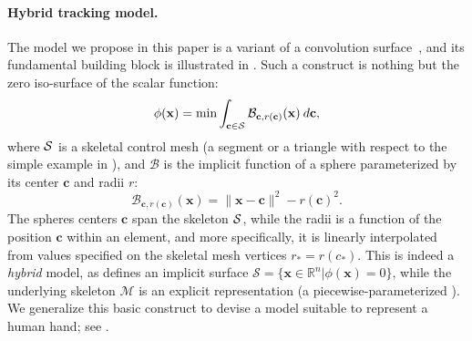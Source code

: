 \paragraph{Hybrid tracking model.}
The model we propose in this paper is a variant of a convolution surface~\cite{bloomenthal1991convolution}, and its fundamental building block is illustrated in . Such a construct is nothing but the zero iso-surface of the scalar function:
\begin{equation}
\phi(\mathbf{x}) = \min \int_{\mathbf{c} \in \mathcal{S}} \mathcal{B}_{\mathbf{c}, r(\mathbf{c})}(\mathbf{x}) \: d\mathbf{c},
\label{eq:convsurf}
\end{equation}
where $\mathcal{S}$ is a skeletal control mesh (a segment or a triangle with respect to the simple example in ), and $\mathcal{B}$ is the implicit function of a sphere parameterized by its center $\mathbf{c}$ and radii $r$:
\begin{equation}
\mathcal{B}_{\mathbf{c}, r(\mathbf{c})}(\mathbf{x}) = \|\mathbf{x}-\mathbf{c}\|^2 - r(\mathbf{c})^2.
\end{equation}
The spheres centers $\mathbf{c}$ span the skeleton $\mathcal{S}$, while the radii is a function of the position $\mathbf{c}$ within an element, and more specifically, it is linearly interpolated from values specified on the skeletal mesh vertices $r_*=r(c_*)$. This is indeed a \emph{hybrid} model, as  defines an implicit surface $\mathcal{S} = \{\mathbf{x} \in \mathbb{R}^n | \phi(\mathbf{x})=0 \}$, while the underlying skeleton $\mathcal{M}$ is an explicit representation (a piecewise-parameterized ). We generalize this basic construct to devise a model suitable to represent a human hand; see .


